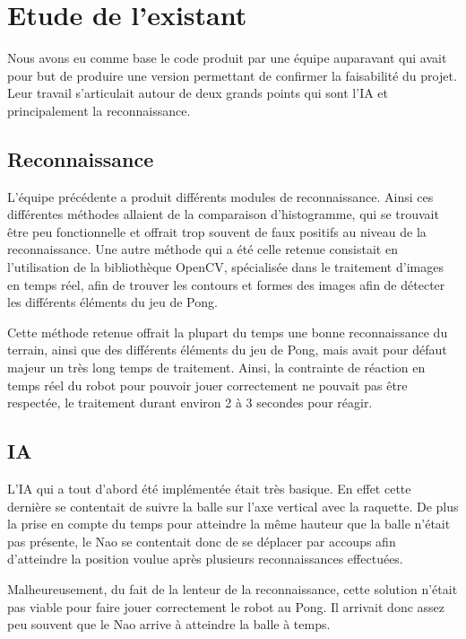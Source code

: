 \section{Etude de l'existant}
\label{sec:Etude de l'existant}
\par Nous avons eu comme base le code produit par une équipe auparavant qui avait pour 
but de produire une version permettant de confirmer la faisabilité du projet. Leur travail 
s'articulait autour de deux grands points qui sont l'IA et principalement la reconnaissance.

    \subsection{Reconnaissance}
    \par L'équipe précédente a produit différents modules de 
    reconnaissance. Ainsi ces différentes méthodes allaient de la comparaison d'histogramme, 
    qui se trouvait être peu fonctionnelle et offrait trop souvent de faux positifs au niveau 
    de la reconnaissance. Une autre méthode qui a été celle retenue consistait en l'utilisation 
    de la bibliothèque OpenCV, spécialisée dans le traitement d'images en temps réel, afin de 
    trouver les contours et formes des images afin de détecter les différents éléments du jeu de Pong.
    
    \par Cette méthode retenue offrait la plupart du temps une bonne reconnaissance du terrain,
    ainsi que des différents éléments du jeu de Pong, mais avait pour défaut majeur un très long 
    temps de traitement. Ainsi, la contrainte de réaction en temps réel du robot pour pouvoir jouer 
    correctement ne pouvait pas être respectée, le traitement durant environ 2 à 3 secondes pour réagir.
    
    \subsection{IA}
    \par L'IA qui a tout d'abord été implémentée était très basique. En effet cette dernière se contentait 
    de suivre la balle sur l'axe vertical avec la raquette. De plus la prise en compte du temps pour atteindre 
    la même hauteur que la balle n'était pas présente, le Nao se contentait donc de se déplacer par accoups afin 
    d'atteindre la position voulue après plusieurs reconnaissances effectuées.
    
    \par Malheureusement, du fait de la lenteur de la reconnaissance, cette solution n'était pas viable 
    pour faire jouer correctement le robot au Pong. Il arrivait donc assez peu souvent que le Nao arrive à 
    atteindre la balle à temps.
    
